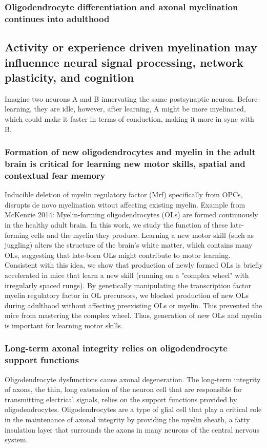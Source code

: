 \begin{itemize}
\begin{itemize}
\subsubsection{Oligodendrocyte differentiation and axonal myelination continues into adulthood}
\subsection{Activity or experience driven myelination may influennce neural signal processing, network plasticity, and cognition}
Imagine two neurons A and B innervating the same postsynaptic neuron. Before-learning, they are idle, however, after learning, A might be more myelinated, which could make it faster in terms of conduction, making it more in sync with B.

\subsubsection{Formation of new oligodendrocytes and myelin in the adult brain
is critical for learning new motor skills, spatial and contextual fear memory}
Inducible deletion of myelin regulatory factor (Mrf) specifically from OPCs, disrupts de novo myelination witout affecting existing myelin. Example from McKenzie 2014: Myelin-forming oligodendrocytes (OLs) are formed continuously in the healthy adult brain. In this work, we study the function of these late-forming cells and the myelin they produce. Learning a new motor skill (such as juggling) alters the structure of the brain's white matter, which contains many OLs, suggesting that late-born OLs might contribute to motor learning. Consistent with this idea, we show that production of newly formed OLs is briefly accelerated in mice that learn a new skill (running on a "complex wheel" with irregularly spaced rungs). By genetically manipulating the transcription factor myelin regulatory factor in OL precursors, we blocked production of new OLs during adulthood without affecting preexisting OLs or myelin. This prevented the mice from mastering the complex wheel. Thus, generation of new OLs and myelin is important for learning motor skills.
\subsubsection{Long-term axonal integrity relies on oligodendrocyte support functions}
Oligodendrocyte dysfunctions cause axonal degeneration.
The long-term integrity of axons, the thin, long extension of the neuron cell that are responsible for transmitting electrical signals, relies on the support functions provided by oligodendrocytes. Oligodendrocytes are a type of glial cell that play a critical role in the maintenance of axonal integrity by providing the myelin sheath, a fatty insulation layer that surrounds the axons in many neurons of the central nervous system.


\end{itemize}
\end{itemize}
